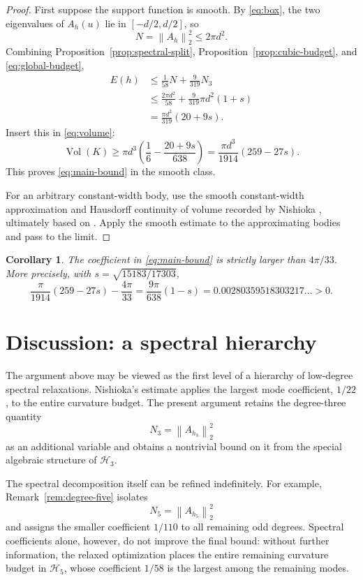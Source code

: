 \documentclass[11pt,reqno]{amsart}
\newtheorem{corollary}[theorem]{Corollary}
\theoremstyle{remark}
\newcommand{\Harm}{\mathcal H}
\newcommand{\Vol}{\operatorname{Vol}}
\newcommand{\norm}[1]{\left\lVert #1\right\rVert}
\begin{document}
\begin{proof}
First suppose the support function is smooth. By \eqref{eq:box}, the two
eigenvalues of $A_h(u)$ lie in $[-d/2,d/2]$, so
\begin{equation}\label{eq:global-budget}
 N=\norm{A_h}_2^2\le 2\pi d^2.
\end{equation}
Combining Proposition~\ref{prop:spectral-split},
Proposition~\ref{prop:cubic-budget}, and \eqref{eq:global-budget},
\begin{align*}
 E(h)
 &\le \frac1{58}N+\frac9{319}N_3\\
 &\le \frac{2\pi d^2}{58}
  +\frac9{319}\pi d^2(1+s)\\
 &=\frac{\pi d^2}{319}(20+9s).
\end{align*}
Insert this in \eqref{eq:volume}:
\[
 \Vol(K)
 \ge\pi d^3\left(\frac16-\frac{20+9s}{638}\right)
 =\frac{\pi d^3}{1914}(259-27s).
\]
This proves \eqref{eq:main-bound} in the smooth class.

For an arbitrary constant-width body, use the smooth constant-width
approximation and Hausdorff continuity of volume recorded by Nishioka
\cite[Lemma 2]{Nishioka2027}, ultimately based on
\cite[Theorem 8.5.1]{MartiniMontejanoOliveros2019}. Apply the smooth estimate to
the approximating bodies and pass to the limit.
\end{proof}

\begin{corollary}\label{cor:improvement}
The coefficient in \eqref{eq:main-bound} is strictly larger than $4\pi/33$.
More precisely, with $s=\sqrt{15183/17303}$,
\[
 \frac{\pi}{1914}(259-27s)-\frac{4\pi}{33}
 =\frac{9\pi}{638}(1-s)
 =0.00280359518303217\ldots>0.
\]
\end{corollary}

\section{Discussion: a spectral hierarchy}

The argument above may be viewed as the first level of a hierarchy of
low-degree spectral relaxations. Nishioka's estimate applies the largest mode
coefficient, $1/22$, to the entire curvature budget. The present argument
retains the degree-three quantity
\[
 N_3=\norm{A_{h_3}}_2^2
\]
as an additional variable and obtains a nontrivial bound on it from the special
algebraic structure of $\Harm_3$.

The spectral decomposition itself can be refined indefinitely. For example,
Remark~\ref{rem:degree-five} isolates
\[
 N_5=\norm{A_{h_5}}_2^2
\]
and assigns the smaller coefficient $1/110$ to all remaining odd degrees.
Spectral coefficients alone, however, do not improve the final bound: without
further information, the relaxed optimization places the entire remaining
curvature budget in $\Harm_5$, whose coefficient $1/58$ is the largest among
the remaining modes.
\end{document}
